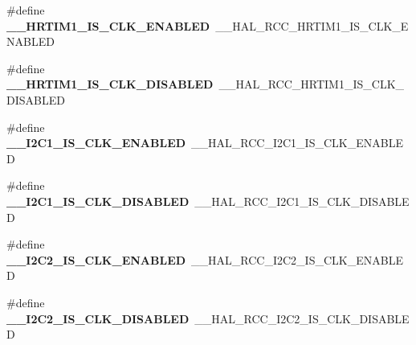 \begin{DoxyCompactItemize}
\item 
\#define {\bfseries \+\_\+\+\_\+\+H\+R\+T\+I\+M1\+\_\+\+I\+S\+\_\+\+C\+L\+K\+\_\+\+E\+N\+A\+B\+L\+ED}~\+\_\+\+\_\+\+H\+A\+L\+\_\+\+R\+C\+C\+\_\+\+H\+R\+T\+I\+M1\+\_\+\+I\+S\+\_\+\+C\+L\+K\+\_\+\+E\+N\+A\+B\+L\+ED\hypertarget{group___h_a_l___r_c_c___aliased_gae84c10963c2caf54c3937a2238a53a94}{}\label{group___h_a_l___r_c_c___aliased_gae84c10963c2caf54c3937a2238a53a94}

\item 
\#define {\bfseries \+\_\+\+\_\+\+H\+R\+T\+I\+M1\+\_\+\+I\+S\+\_\+\+C\+L\+K\+\_\+\+D\+I\+S\+A\+B\+L\+ED}~\+\_\+\+\_\+\+H\+A\+L\+\_\+\+R\+C\+C\+\_\+\+H\+R\+T\+I\+M1\+\_\+\+I\+S\+\_\+\+C\+L\+K\+\_\+\+D\+I\+S\+A\+B\+L\+ED\hypertarget{group___h_a_l___r_c_c___aliased_ga85ad0fee52b035d3663383cb1726c851}{}\label{group___h_a_l___r_c_c___aliased_ga85ad0fee52b035d3663383cb1726c851}

\item 
\#define {\bfseries \+\_\+\+\_\+\+I2\+C1\+\_\+\+I\+S\+\_\+\+C\+L\+K\+\_\+\+E\+N\+A\+B\+L\+ED}~\+\_\+\+\_\+\+H\+A\+L\+\_\+\+R\+C\+C\+\_\+\+I2\+C1\+\_\+\+I\+S\+\_\+\+C\+L\+K\+\_\+\+E\+N\+A\+B\+L\+ED\hypertarget{group___h_a_l___r_c_c___aliased_gafa49d489dd7544b4bcf0c5edca14f721}{}\label{group___h_a_l___r_c_c___aliased_gafa49d489dd7544b4bcf0c5edca14f721}

\item 
\#define {\bfseries \+\_\+\+\_\+\+I2\+C1\+\_\+\+I\+S\+\_\+\+C\+L\+K\+\_\+\+D\+I\+S\+A\+B\+L\+ED}~\+\_\+\+\_\+\+H\+A\+L\+\_\+\+R\+C\+C\+\_\+\+I2\+C1\+\_\+\+I\+S\+\_\+\+C\+L\+K\+\_\+\+D\+I\+S\+A\+B\+L\+ED\hypertarget{group___h_a_l___r_c_c___aliased_gadd1e2d944945531b64d71bf9e261a777}{}\label{group___h_a_l___r_c_c___aliased_gadd1e2d944945531b64d71bf9e261a777}

\item 
\#define {\bfseries \+\_\+\+\_\+\+I2\+C2\+\_\+\+I\+S\+\_\+\+C\+L\+K\+\_\+\+E\+N\+A\+B\+L\+ED}~\+\_\+\+\_\+\+H\+A\+L\+\_\+\+R\+C\+C\+\_\+\+I2\+C2\+\_\+\+I\+S\+\_\+\+C\+L\+K\+\_\+\+E\+N\+A\+B\+L\+ED\hypertarget{group___h_a_l___r_c_c___aliased_ga06cc90a44300051aaa95e148297f3172}{}\label{group___h_a_l___r_c_c___aliased_ga06cc90a44300051aaa95e148297f3172}

\item 
\#define {\bfseries \+\_\+\+\_\+\+I2\+C2\+\_\+\+I\+S\+\_\+\+C\+L\+K\+\_\+\+D\+I\+S\+A\+B\+L\+ED}~\+\_\+\+\_\+\+H\+A\+L\+\_\+\+R\+C\+C\+\_\+\+I2\+C2\+\_\+\+I\+S\+\_\+\+C\+L\+K\+\_\+\+D\+I\+S\+A\+B\+L\+ED\hypertarget{group___h_a_l___r_c_c___aliased_ga2c2789ff86b604021d9f66c2f689babb}{}\label{group___h_a_l___r_c_c___aliased_ga2c2789ff86b604021d9f66c2f689babb}


\end{DoxyCompactItemize}
